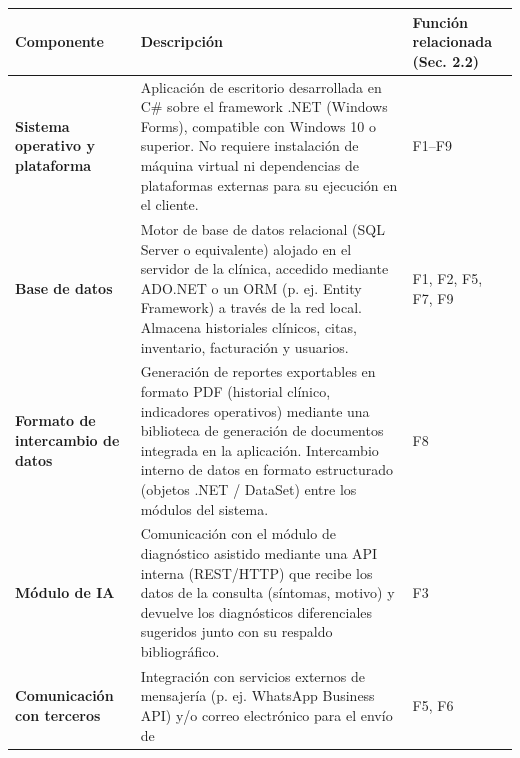 {\def\LTcaptype{none} %
\begin{longtable}[]{@{}
  >{\raggedright\arraybackslash}p{}
  >{\raggedright\arraybackslash}p{}
  >{\raggedright\arraybackslash}p{}@{}}
\toprule\noalign{}
\begin{minipage}[b]{\linewidth}\raggedright
\textbf{Componente}
\end{minipage} & \begin{minipage}[b]{\linewidth}\raggedright
\textbf{Descripción}
\end{minipage} & \begin{minipage}[b]{\linewidth}\raggedright
\textbf{Función relacionada (Sec. 2.2)}
\end{minipage} \\
\midrule\noalign{}
\endhead
\bottomrule\noalign{}
\endlastfoot
\textbf{Sistema operativo y plataforma} &
\begin{minipage}[t]{\linewidth}\raggedright
Aplicación de escritorio desarrollada en C\# sobre el framework .NET (Windows Forms), compatible con Windows 10 o superior. No requiere
instalación de máquina virtual ni dependencias de plataformas externas
para su ejecución en el cliente.
\end{minipage} & F1--F9 \\
\textbf{Base de datos} & \begin{minipage}[t]{\linewidth}\raggedright
Motor de base de datos relacional (SQL Server o equivalente) alojado en
el servidor de la clínica, accedido mediante ADO.NET o un ORM (p. ej.
Entity Framework) a través de la red local. Almacena historiales
clínicos, citas, inventario, facturación y usuarios.
\end{minipage} & F1, F2, F5, F7, F9 \\
\textbf{Formato de intercambio de datos} &
\begin{minipage}[t]{\linewidth}\raggedright
Generación de reportes exportables en formato PDF (historial clínico,
indicadores operativos) mediante una biblioteca de generación de
documentos integrada en la aplicación. Intercambio interno de datos en formato estructurado (objetos .NET / DataSet) entre los módulos del sistema.
\end{minipage} & F8 \\
\textbf{Módulo de IA} & \begin{minipage}[t]{\linewidth}\raggedright
Comunicación con el módulo de diagnóstico asistido mediante una API
interna (REST/HTTP) que recibe los datos de la consulta (síntomas,
motivo) y devuelve los diagnósticos diferenciales sugeridos junto con su
respaldo bibliográfico.
\end{minipage} & F3 \\
\textbf{Comunicación con terceros} &
\begin{minipage}[t]{\linewidth}\raggedright
Integración con servicios externos de mensajería (p. ej. WhatsApp
Business API) y/o correo electrónico para el envío de
\end{minipage} & F5, F6 \\
\end{longtable}
}

